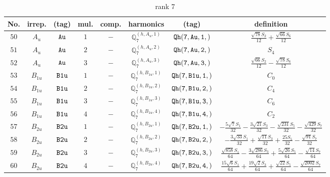 \documentclass[fleqn,8pt]{jsarticle}
\begin{document}
\begin{table}[ht!]
\begin{center}
\caption{rank 7}
\renewcommand{\arraystretch}{1.3}
\begin{tabular}{cccccccc} \hline \hline
No. & irrep. & (tag) & mul. & comp. & harmonics & (tag) & definition \\ \hline
$ 50 $ & $ A_{u} $ & $ {\tt Au} $ & $ 1 $ & $ - $ & $ \mathbb{Q}_{7}^{(h,A_{u},1)} $ & $ {\tt Qh(7,Au,1,)} $ & $ \frac{\sqrt{78} S_{2}}{12} + \frac{\sqrt{66} S_{6}}{12} $ \\
$ 51 $ & $ A_{u} $ & $ {\tt Au} $ & $ 2 $ & $ - $ & $ \mathbb{Q}_{7}^{(h,A_{u},2)} $ & $ {\tt Qh(7,Au,2,)} $ & $ S_{4} $ \\
$ 52 $ & $ A_{u} $ & $ {\tt Au} $ & $ 3 $ & $ - $ & $ \mathbb{Q}_{7}^{(h,A_{u},3)} $ & $ {\tt Qh(7,Au,3,)} $ & $ \frac{\sqrt{66} S_{2}}{12} - \frac{\sqrt{78} S_{6}}{12} $ \\
$ 53 $ & $ B_{1u} $ & $ {\tt B1u} $ & $ 1 $ & $ - $ & $ \mathbb{Q}_{7}^{(h,B_{1u},1)} $ & $ {\tt Qh(7,B1u,1,)} $ & $ C_{0} $ \\
$ 54 $ & $ B_{1u} $ & $ {\tt B1u} $ & $ 2 $ & $ - $ & $ \mathbb{Q}_{7}^{(h,B_{1u},2)} $ & $ {\tt Qh(7,B1u,2,)} $ & $ C_{4} $ \\
$ 55 $ & $ B_{1u} $ & $ {\tt B1u} $ & $ 3 $ & $ - $ & $ \mathbb{Q}_{7}^{(h,B_{1u},3)} $ & $ {\tt Qh(7,B1u,3,)} $ & $ C_{6} $ \\
$ 56 $ & $ B_{1u} $ & $ {\tt B1u} $ & $ 4 $ & $ - $ & $ \mathbb{Q}_{7}^{(h,B_{1u},4)} $ & $ {\tt Qh(7,B1u,4,)} $ & $ C_{2} $ \\
$ 57 $ & $ B_{2u} $ & $ {\tt B2u} $ & $ 1 $ & $ - $ & $ \mathbb{Q}_{7}^{(h,B_{2u},1)} $ & $ {\tt Qh(7,B2u,1,)} $ & $ - \frac{5 \sqrt{7} S_{1}}{32} - \frac{3 \sqrt{21} S_{3}}{32} - \frac{\sqrt{231} S_{5}}{32} - \frac{\sqrt{429} S_{7}}{32} $ \\
$ 58 $ & $ B_{2u} $ & $ {\tt B2u} $ & $ 2 $ & $ - $ & $ \mathbb{Q}_{7}^{(h,B_{2u},2)} $ & $ {\tt Qh(7,B2u,2,)} $ & $ - \frac{3 \sqrt{33} S_{1}}{32} + \frac{\sqrt{11} S_{3}}{32} + \frac{25 S_{5}}{32} - \frac{\sqrt{91} S_{7}}{32} $ \\
$ 59 $ & $ B_{2u} $ & $ {\tt B2u} $ & $ 3 $ & $ - $ & $ \mathbb{Q}_{7}^{(h,B_{2u},3)} $ & $ {\tt Qh(7,B2u,3,)} $ & $ \frac{\sqrt{858} S_{1}}{64} - \frac{3 \sqrt{286} S_{3}}{64} + \frac{5 \sqrt{26} S_{5}}{64} - \frac{\sqrt{14} S_{7}}{64} $ \\
$ 60 $ & $ B_{2u} $ & $ {\tt B2u} $ & $ 4 $ & $ - $ & $ \mathbb{Q}_{7}^{(h,B_{2u},4)} $ & $ {\tt Qh(7,B2u,4,)} $ & $ \frac{15 \sqrt{6} S_{1}}{64} + \frac{19 \sqrt{2} S_{3}}{64} + \frac{\sqrt{22} S_{5}}{64} - \frac{\sqrt{2002} S_{7}}{64} $ \\

\end{tabular}
\end{center}
\end{table}
\end{document}
